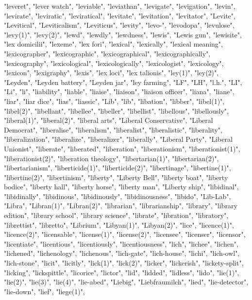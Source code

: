"leveret",
"lever watch",
"leviable",
"leviathan",
"levigate",
"levigation",
"levin",
"levirate",
"leviratic",
"leviratical",
"levitate",
"levitation",
"levitator",
"Levite",
"Levitical",
"Leviticalism",
"Leviticus",
"levity",
"levo-",
"levodopa",
"levulose",
"levy(1)",
"levy(2)",
"lewd",
"lewdly",
"lewdness",
"lewis",
"Lewis gun",
"lewisite",
"lex domicilii",
"lexeme",
"lex fori",
"lexical",
"lexically",
"lexical meaning",
"lexicographer",
"lexicographic",
"lexicographical",
"lexicographically",
"lexicography",
"lexicological",
"lexicologically",
"lexicologist",
"lexicology",
"lexicon",
"lexigraphy",
"lexis",
"lex loci",
"lex talionis",
"ley(1)",
"ley(2)",
"Leyden",
"Leyden battery",
"Leyden jar",
"ley farming",
"LF",
"LH",
"l.h.",
"LI",
"Li",
"li",
"liability",
"liable",
"liaise",
"liaison",
"liaison officer",
"liana",
"liane",
"liar",
"liar dice",
"lias",
"liassic",
"Lib",
"lib",
"libation",
"libber",
"libel(1)",
"libel(2)",
"libellant",
"libellee",
"libeller",
"libellist",
"libellous",
"libellously",
"liberal(1)",
"liberal(2)",
"liberal arts",
"Liberal Conservative",
"Liberal Democrat",
"liberalise",
"liberalism",
"liberalist",
"liberalistic",
"liberality",
"liberalization",
"liberalize",
"liberalizer",
"liberally",
"Liberal Party",
"Liberal Unionist",
"liberate",
"liberated",
"liberation",
"liberationism",
"liberationist(1)",
"liberationist(2)",
"liberation theology",
"libertarian(1)",
"libertarian(2)",
"libertarianism",
"liberticide(1)",
"liberticide(2)",
"libertinage",
"libertine(1)",
"libertine(2)",
"libertinism",
"liberty",
"Liberty Bell",
"liberty boat",
"liberty bodice",
"liberty hall",
"liberty horse",
"liberty man",
"Liberty ship",
"libidinal",
"libidinally",
"libidinous",
"libidinously",
"libidinousness",
"libido",
"Lib-Lab",
"Libra",
"Libran(1)",
"Libran(2)",
"librarian",
"librarianship",
"library",
"library edition",
"library school",
"library science",
"librate",
"libration",
"libratory",
"librettist",
"libretto",
"Librium",
"Libyan(1)",
"Libyan(2)",
"lice",
"licence(1)",
"licence(2)",
"licensable",
"license(1)",
"license(2)",
"licensee",
"licenser",
"licensor",
"licentiate",
"licentious",
"licentiously",
"licentiousness",
"lich",
"lichee",
"lichen",
"lichened",
"lichenology",
"lichenous",
"lich-gate",
"lich-house",
"lichi",
"lich-owl",
"lich-stone",
"licit",
"licitly",
"lick(1)",
"lick(2)",
"licker",
"lickerish",
"lickety-split",
"licking",
"lickspittle",
"licorice",
"lictor",
"lid",
"lidded",
"lidless",
"lido",
"lie(1)",
"lie(2)",
"lie(3)",
"lie(4)",
"lie-abed",
"Liebig",
"Liebfraumilch",
"lied",
"lie-detector",
"lie-down",
"lief",
"liege(1)",
